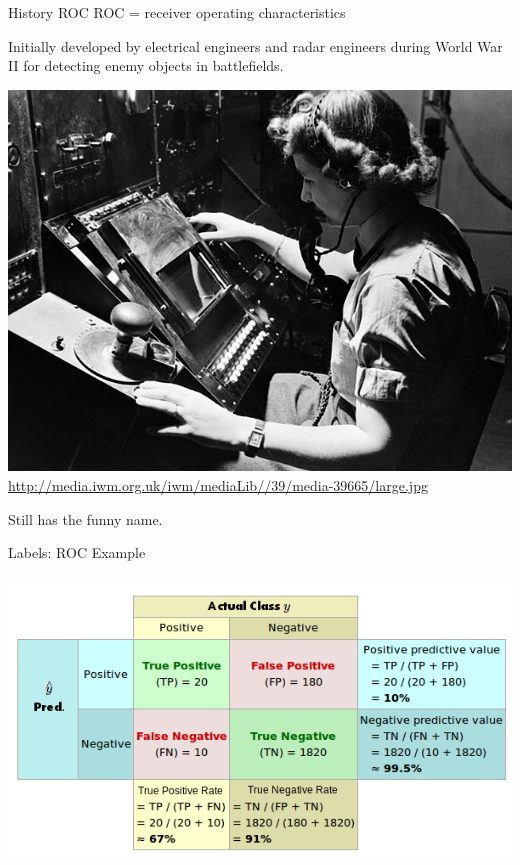 \documentclass[11pt,compress,t,notes=noshow, xcolor=table]{beamer}
\begin{document}
\begin{frame}{History ROC}
ROC = receiver operating characteristics

\lz

Initially developed by electrical engineers and radar engineers during World War II for detecting enemy objects in battlefields. 

\begin{center}
\includegraphics[width=.4\textwidth]{figure_man/receiver_operator.jpg}
{\tiny \url{http://media.iwm.org.uk/iwm/mediaLib//39/media-39665/large.jpg}}
\end{center}

Still has the funny name.
\end{frame}


\begin{vbframe}{Labels: ROC}
Example
\begin{center}
  \includegraphics[width=\textwidth]{figure_man/roc-confmatrix-example.png}
\end{center}

\end{vbframe}
\end{document}
